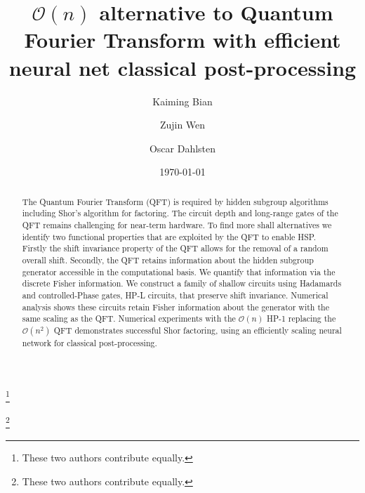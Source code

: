 \documentclass[reprint, aps, prl, superscriptaddress]{revtex4-2}
\begin{document}
\title{$\mathcal{O}(n)$ alternative to Quantum Fourier Transform with efficient neural net classical post-processing}


\author{Kaiming Bian}
\thanks{These two authors contribute equally.}

\author{Zujin Wen}
\thanks{These two authors contribute equally.}
\author{Oscar Dahlsten}
\date{\today}

\begin{abstract}
The Quantum Fourier Transform (QFT) is required by hidden subgroup algorithms including Shor's algorithm for factoring. The circuit depth and long-range gates of the QFT remains challenging for near-term hardware. To find more shall alternatives we identify two functional properties that are exploited by the QFT to enable HSP. Firstly the shift invariance property of the QFT allows for the removal of a random overall shift. Secondly, the QFT retains information about the hidden subgroup generator accessible in the computational basis. We quantify that information via the discrete Fisher information. We construct a family of shallow circuits using Hadamards and controlled-Phase gates, HP-L circuits, that preserve shift invariance. Numerical analysis shows these circuits retain Fisher information about the generator with the same scaling as the QFT.  Numerical experiments with the $\mathcal{O}(n)$ HP-1 replacing the $\mathcal{O}(n^2)$ QFT demonstrates successful Shor factoring, using an efficiently scaling neural network for classical post-processing. 
\end{abstract}
\end{document}
